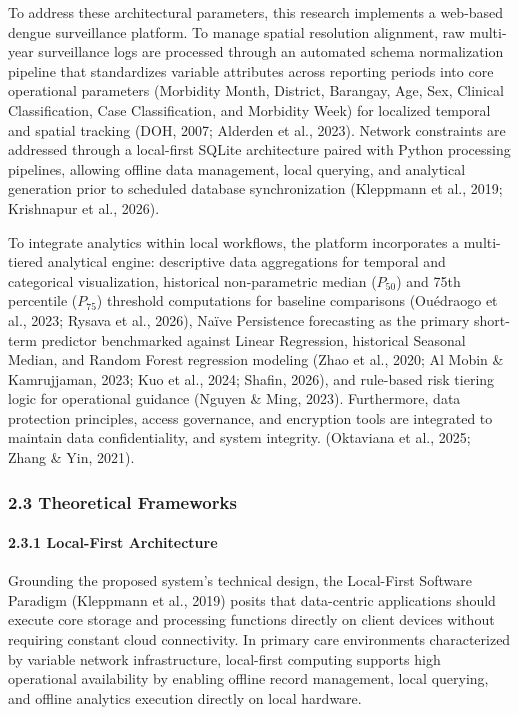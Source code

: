 \documentclass[
]{article}
\begin{document}
To address these architectural parameters, this research implements a
web-based dengue surveillance platform. To manage spatial resolution
alignment, raw multi-year surveillance logs are processed through an
automated schema normalization pipeline that standardizes variable
attributes across reporting periods into core operational parameters
(Morbidity Month, District, Barangay, Age, Sex, Clinical Classification,
Case Classification, and Morbidity Week) for localized temporal and
spatial tracking (DOH, 2007; Alderden et al., 2023). Network constraints
are addressed through a local-first SQLite architecture paired with
Python processing pipelines, allowing offline data management, local
querying, and analytical generation prior to scheduled database
synchronization (Kleppmann et al., 2019; Krishnapur et al., 2026).

To integrate analytics within local workflows, the platform incorporates
a multi-tiered analytical engine: descriptive data aggregations for
temporal and categorical visualization, historical non-parametric median
(\(P_{50}\)) and 75th percentile (\(P_{75}\)) threshold computations for
baseline comparisons (Ouédraogo et al., 2023; Rysava et al., 2026),
Naïve Persistence forecasting as the primary short-term predictor
benchmarked against Linear Regression, historical Seasonal Median, and
Random Forest regression modeling (Zhao et al., 2020; Al Mobin \&
Kamrujjaman, 2023; Kuo et al., 2024; Shafin, 2026), and rule-based risk
tiering logic for operational guidance (Nguyen \& Ming, 2023).
Furthermore, data protection principles, access governance, and
encryption tools are integrated to maintain data confidentiality, and
system integrity. (Oktaviana et al., 2025; Zhang \& Yin, 2021).

\subsubsection{\texorpdfstring{\textbf{2.3 Theoretical Frameworks}
}{2.3 Theoretical Frameworks }}\label{theoretical-frameworks}

\paragraph{\texorpdfstring{\textbf{2.3.1 Local-First Architecture}
}{2.3.1 Local-First Architecture }}\label{local-first-architecture}

Grounding the proposed system's technical design, the Local-First
Software Paradigm (Kleppmann et al., 2019) posits that data-centric
applications should execute core storage and processing functions
directly on client devices without requiring constant cloud
connectivity. In primary care environments characterized by variable
network infrastructure, local-first computing supports high operational
availability by enabling offline record management, local querying, and
offline analytics execution directly on local hardware.
\end{document}
